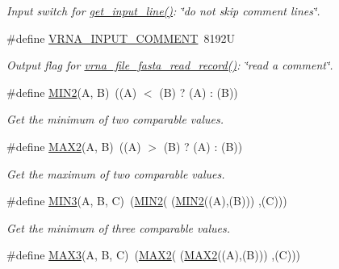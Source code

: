 \begin{DoxyCompactItemize}
\begin{DoxyCompactList}\small\item\em Input switch for \hyperlink{group__utils_ga8ef1835eb83f542396f59f0b205965e5}{get\+\_\+input\+\_\+line()}\+: {\itshape \char`\"{}do not skip comment lines\char`\"{}}. \end{DoxyCompactList}\item 
\hypertarget{group__utils_gaf2062e0eeefffd3ed639af460b3d4fab}{}\#define \hyperlink{group__utils_gaf2062e0eeefffd3ed639af460b3d4fab}{V\+R\+N\+A\+\_\+\+I\+N\+P\+U\+T\+\_\+\+C\+O\+M\+M\+E\+N\+T}~8192\+U\label{group__utils_gaf2062e0eeefffd3ed639af460b3d4fab}

\begin{DoxyCompactList}\small\item\em Output flag for \hyperlink{group__file__utils_ga8cfb7e271efc9e1f34640acb85475639}{vrna\+\_\+file\+\_\+fasta\+\_\+read\+\_\+record()}\+: {\itshape \char`\"{}read a comment\char`\"{}}. \end{DoxyCompactList}\item 
\hypertarget{group__utils_gae0b9cd0ce090bd69b951aa73e8fa4f7d}{}\#define \hyperlink{group__utils_gae0b9cd0ce090bd69b951aa73e8fa4f7d}{M\+I\+N2}(A,  B)~((A) $<$ (B) ? (A) \+: (B))\label{group__utils_gae0b9cd0ce090bd69b951aa73e8fa4f7d}

\begin{DoxyCompactList}\small\item\em Get the minimum of two comparable values. \end{DoxyCompactList}\item 
\hypertarget{group__utils_ga33297b3679c713b0c4d897cd0fe3b122}{}\#define \hyperlink{group__utils_ga33297b3679c713b0c4d897cd0fe3b122}{M\+A\+X2}(A,  B)~((A) $>$ (B) ? (A) \+: (B))\label{group__utils_ga33297b3679c713b0c4d897cd0fe3b122}

\begin{DoxyCompactList}\small\item\em Get the maximum of two comparable values. \end{DoxyCompactList}\item 
\hypertarget{group__utils_ga721b8d5f3abef17f10293f1f7f8c958e}{}\#define \hyperlink{group__utils_ga721b8d5f3abef17f10293f1f7f8c958e}{M\+I\+N3}(A,  B,  C)~(\hyperlink{group__utils_gae0b9cd0ce090bd69b951aa73e8fa4f7d}{M\+I\+N2}(  (\hyperlink{group__utils_gae0b9cd0ce090bd69b951aa73e8fa4f7d}{M\+I\+N2}((A),(B))) ,(C)))\label{group__utils_ga721b8d5f3abef17f10293f1f7f8c958e}

\begin{DoxyCompactList}\small\item\em Get the minimum of three comparable values. \end{DoxyCompactList}\item 
\hypertarget{group__utils_ga8d577123d2e66d2b7d0bf9af6e172b93}{}\#define \hyperlink{group__utils_ga8d577123d2e66d2b7d0bf9af6e172b93}{M\+A\+X3}(A,  B,  C)~(\hyperlink{group__utils_ga33297b3679c713b0c4d897cd0fe3b122}{M\+A\+X2}(  (\hyperlink{group__utils_ga33297b3679c713b0c4d897cd0fe3b122}{M\+A\+X2}((A),(B))) ,(C)))\label{group__utils_ga8d577123d2e66d2b7d0bf9af6e172b93}


\end{DoxyCompactItemize}
